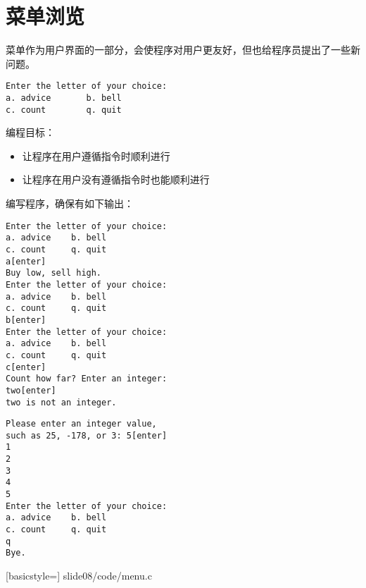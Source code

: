 \section{菜单浏览}
\begin{frame}[fragile]\ft{\secname}
菜单作为用户界面的一部分，会使程序对用户更友好，但也给程序员提出了一些新问题。
\begin{lstlisting}
Enter the letter of your choice:
a. advice       b. bell
c. count        q. quit   
\end{lstlisting}
编程目标：
\begin{itemize}
\item 让程序在用户遵循指令时顺利进行
\item 让程序在用户没有遵循指令时也能顺利进行
\end{itemize}
\end{frame}

\begin{frame}[fragile]\ft{\secname}
编写程序，确保有如下输出：
\end{frame}

\begin{frame}[fragile]\ft{\secname}
\begin{lstlisting}
Enter the letter of your choice:
a. advice    b. bell
c. count     q. quit
a[enter]
Buy low, sell high.
Enter the letter of your choice:
a. advice    b. bell
c. count     q. quit
b[enter]
Enter the letter of your choice:
a. advice    b. bell
c. count     q. quit
c[enter]
Count how far? Enter an integer:
two[enter]
two is not an integer.
\end{lstlisting}
\end{frame}

\begin{frame}[fragile]\ft{\secname}
\begin{lstlisting}
Please enter an integer value, 
such as 25, -178, or 3: 5[enter]
1
2
3
4
5
Enter the letter of your choice:
a. advice    b. bell
c. count     q. quit
q
Bye.
\end{lstlisting}
\end{frame}

\begin{frame}\ft{\secname}

[basicstyle=\ttfamily\small]
{slide08/code/menu.c}
\end{frame}

